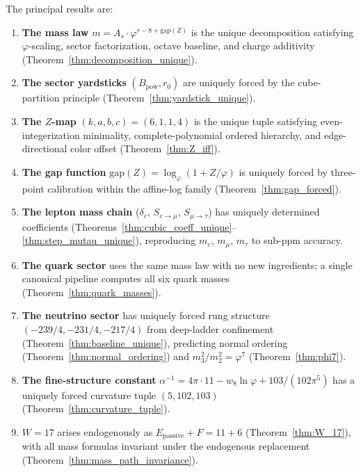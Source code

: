 \documentclass[11pt,a4paper]{article}
\theoremstyle{definition}
\theoremstyle{remark}
\newcommand{\phig}{\varphi}
\newcommand{\Epass}{E_{\mathrm{passive}}}
\newcommand{\Zidx}{Z}
\newcommand{\weig}{w_8}
\begin{document}
The principal results are:

\begin{enumerate}[nosep]
  \item \textbf{The mass law} $m = A_s \cdot \phig^{r - 8 + \mathrm{gap}(Z)}$
    is the unique decomposition satisfying $\phig$-scaling, sector
    factorization, octave baseline, and charge additivity
    (Theorem~\ref{thm:decomposition_unique}).

  \item \textbf{The sector yardsticks} $(B_{\mathrm{pow}}, r_0)$ are uniquely
    forced by the cube-partition principle
    (Theorem~\ref{thm:yardstick_unique}).

  \item \textbf{The $\Zidx$-map} $(k, a, b, c) = (6, 1, 1, 4)$ is the unique
    tuple satisfying even-integerization minimality, complete-polynomial
    ordered hierarchy, and edge-directional color offset
    (Theorem~\ref{thm:Z_iff}).

  \item \textbf{The gap function} $\mathrm{gap}(Z) = \log_\phig(1 + Z/\phig)$
    is uniquely forced by three-point calibration within the affine-log
    family (Theorem~\ref{thm:gap_forced}).

  \item \textbf{The lepton mass chain} ($\delta_e$, $S_{e\to\mu}$,
    $S_{\mu\to\tau}$) has uniquely determined coefficients
    (Theorems~\ref{thm:cubic_coeff_unique}--\ref{thm:step_mutau_unique}),
    reproducing $m_e$, $m_\mu$, $m_\tau$ to sub-ppm accuracy.

  \item \textbf{The quark sector} uses the same mass law with no new
    ingredients; a single canonical pipeline computes all six quark masses
    (Theorem~\ref{thm:quark_masses}).

  \item \textbf{The neutrino sector} has uniquely forced rung structure
    $(-239/4, -231/4, -217/4)$ from deep-ladder confinement
    (Theorem~\ref{thm:baseline_unique}), predicting normal ordering
    (Theorem~\ref{thm:normal_ordering}) and $m_3^2/m_2^2 = \phig^7$
    (Theorem~\ref{thm:phi7}).

  \item \textbf{The fine-structure constant} $\alpha^{-1} = 4\pi \cdot 11 -
    \weig\ln\phig + 103/(102\pi^5)$ has a uniquely forced curvature tuple
    $(5, 102, 103)$ (Theorem~\ref{thm:curvature_tuple}).

  \item \textbf{$W = 17$} arises endogenously as $\Epass + F = 11 + 6$
    (Theorem~\ref{thm:W_17}), with all mass formulas invariant under the
    endogenous replacement (Theorem~\ref{thm:mass_path_invariance}).


\end{enumerate}
\end{document}
